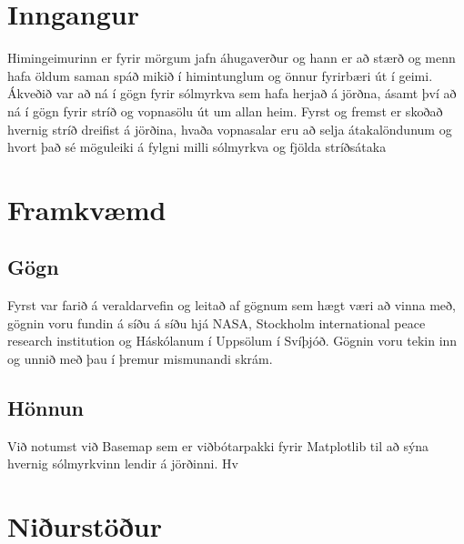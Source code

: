\documentclass[12pt, git, final]{rureport}
\begin{document}
\maketitle  %


%
\section{Inngangur} %
Himingeimurinn er fyrir mörgum jafn áhugaverður og hann er að stærð og menn hafa öldum saman spáð mikið í himintunglum og önnur fyrirbæri út í geimi. Ákveðið var að ná í gögn fyrir sólmyrkva sem hafa herjað á jörðna, ásamt því að ná í gögn fyrir stríð og vopnasölu út um allan heim. Fyrst og fremst er skoðað hvernig stríð dreifist á jörðina, hvaða vopnasalar eru að selja átakalöndunum og hvort það sé möguleiki á fylgni milli sólmyrkva og fjölda stríðsátaka
\section{Framkvæmd}
\subsection{Gögn}
Fyrst var farið á veraldarvefin og leitað af gögnum sem hægt væri að vinna með, gögnin voru fundin á síðu á síðu hjá NASA, Stockholm international peace research institution og Háskólanum í Uppsölum í Svíþjóð. Gögnin voru tekin inn og unnið með þau í þremur mismunandi skrám.
\subsection{Hönnun}
Við notumst við Basemap sem er viðbótarpakki fyrir Matplotlib til að sýna hvernig sólmyrkvinn lendir á jörðinni. Hv
\section{Niðurstöður}\label{nidurstodur}

\pagebreak


\clearpage
\printbibliography
\end{document}
